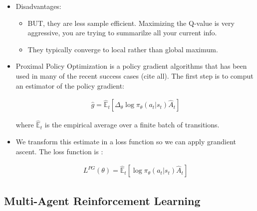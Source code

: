 \documentclass[11pt,english]{article}
\newcommand{\E}{\mathbb{E}}
\begin{document}
\begin{itemize}
	\item Disadvantages:
	\begin{itemize}
	\item  BUT, they are less sample efficient. Maximizing the Q-value is very aggressive, you are trying to summarilze all your current info. 
	\item They typically converge to local rather than global maximum.
	\end{itemize}
	\item Proximal Policy Optimization \citet{schulman2017} is a policy gradient algorithms that has been used in many of the recent success cases (cite all). The first step is to comput an estimator of the policy gradient:
	
	\begin{align*}
	\hat{g} = \hat{\E}_t\left[ \Delta_\theta \log \pi_\theta(a_t | s_t) \hat{A}_t \right]
	\end{align*}
	
	where $\hat{\E}_t$ is the empirical average over a finite batch of transitions. 
		
	\item We transform this estimate in a loss function so we can apply grandient ascent. The loss function is :
	
	\begin{align*}
	L^{PG}(\theta) =  \hat{\E}_t\left[ \log \pi_\theta(a_t | s_t) \hat{A}_t \right]
	\end{align*}
\end{itemize}



\subsection{Multi-Agent Reinforcement Learning}
\end{document}
